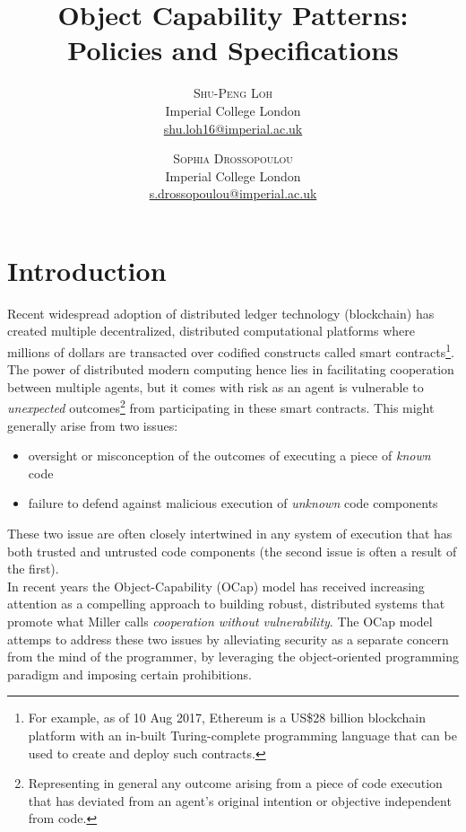 \documentclass[a4paper,11pt, twoside,twocolumn]{article}
\title{Object Capability Patterns:\\Policies and Specifications} %
\author{%
\textsc{Shu-Peng Loh} \\[1ex] %
\normalsize Imperial College London \\ %
\normalsize \href{mailto:shu.loh16@imperial.ac.uk}{shu.loh16@imperial.ac.uk} %
\and %
\textsc{Sophia Drossopoulou}\\[1ex] %
\normalsize Imperial College London \\ %
\normalsize \href{mailto:s.drossopoulou@imperial.ac.uk}{s.drossopoulou@imperial.ac.uk} %
}
\date{} %
\begin{document}
\raggedbottom
\renewcommand{\ref}[1]{\textit{\autoref{#1}}}
\maketitle


\section{Introduction}
Recent widespread adoption of distributed ledger technology (blockchain) has created multiple decentralized, distributed computational platforms where millions of dollars are transacted over codified constructs called smart contracts\footnote{For example, as of 10 Aug 2017, Ethereum is a US\$28 billion blockchain platform with an in-built Turing-complete programming language that can be used to create and deploy such contracts.}.
The power of distributed modern computing hence lies in facilitating cooperation between multiple agents, but it comes with risk as an agent is vulnerable to \textit{unexpected} outcomes\footnote{Representing in general any outcome arising from a piece of code execution that has deviated from an agent's original intention or objective independent from code.} from participating in these smart contracts. This might generally arise from two issues: 
\begin{itemize}
\item oversight or misconception of the outcomes of executing a piece of \textit{known} code
\item failure to defend against malicious execution of \textit{unknown} code components\end{itemize}
\noindent These two issue are often closely intertwined in any system of execution that has both trusted and untrusted code components (the second issue is often a result of the first).\\

In recent years the Object-Capability (OCap) model has received increasing attention as a compelling approach to building robust, distributed systems that promote what Miller\cite{miller2006} calls \textit{cooperation without vulnerability}. The OCap model attemps to address these two issues by alleviating security as a separate concern from the mind of the programmer, by leveraging the object-oriented programming paradigm and imposing certain prohibitions.
\end{document}
